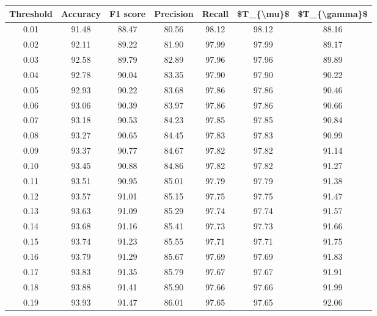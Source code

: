 \begin{tabular}{|c|c|c|c|c|c|c|}
\hline
 Threshold &  Accuracy &  F1 score &  Precision &  Recall &  \$T\_\{\textbackslash mu\}\$ &  \$T\_\{\textbackslash gamma\}\$ \\
\hline
      0.01 &     91.48 &     88.47 &      80.56 &   98.12 &      98.12 &         88.16 \\
      0.02 &     92.11 &     89.22 &      81.90 &   97.99 &      97.99 &         89.17 \\
      0.03 &     92.58 &     89.79 &      82.89 &   97.96 &      97.96 &         89.89 \\
      0.04 &     92.78 &     90.04 &      83.35 &   97.90 &      97.90 &         90.22 \\
      0.05 &     92.93 &     90.22 &      83.68 &   97.86 &      97.86 &         90.46 \\
      0.06 &     93.06 &     90.39 &      83.97 &   97.86 &      97.86 &         90.66 \\
      0.07 &     93.18 &     90.53 &      84.23 &   97.85 &      97.85 &         90.84 \\
      0.08 &     93.27 &     90.65 &      84.45 &   97.83 &      97.83 &         90.99 \\
      0.09 &     93.37 &     90.77 &      84.67 &   97.82 &      97.82 &         91.14 \\
      0.10 &     93.45 &     90.88 &      84.86 &   97.82 &      97.82 &         91.27 \\
      0.11 &     93.51 &     90.95 &      85.01 &   97.79 &      97.79 &         91.38 \\
      0.12 &     93.57 &     91.01 &      85.15 &   97.75 &      97.75 &         91.47 \\
      0.13 &     93.63 &     91.09 &      85.29 &   97.74 &      97.74 &         91.57 \\
      0.14 &     93.68 &     91.16 &      85.41 &   97.73 &      97.73 &         91.66 \\
      0.15 &     93.74 &     91.23 &      85.55 &   97.71 &      97.71 &         91.75 \\
      0.16 &     93.79 &     91.29 &      85.67 &   97.69 &      97.69 &         91.83 \\
      0.17 &     93.83 &     91.35 &      85.79 &   97.67 &      97.67 &         91.91 \\
      0.18 &     93.88 &     91.41 &      85.90 &   97.66 &      97.66 &         91.99 \\
      0.19 &     93.93 &     91.47 &      86.01 &   97.65 &      97.65 &         92.06 \\

\end{tabular}
